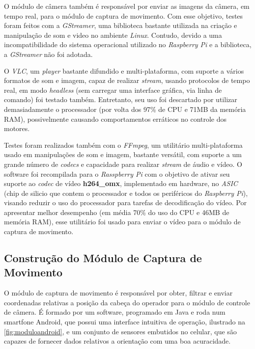 O módulo de câmera também é responsável por enviar as imagens da câmera, em tempo real, para o módulo de captura de movimento. Com esse objetivo, testes foram feitos com a \textit{GStreamer}, uma biblioteca bastante utilizada na criação e manipulação de som e video no ambiente \textit{Linux}. Contudo, devido a uma incompatibilidade do sistema operacional utilizado no \textit{Raspberry Pi} e a biblioteca, a \textit{GStreamer} não foi adotada.\par

O \textit{VLC}, um \textit{player} bastante difundido e multi-plataforma, com suporte a vários formatos de som e imagem, capaz de realizar \textit{stream}, usando protocolos de tempo real, em modo \textit{headless} (sem carregar uma interface gráfica, via linha de comando) foi testado também. Entretanto, seu uso foi descartado por utilizar demasiadamente o processador (por volta dos 97\% de CPU e 71MB da memória RAM), possivelmente causando comportamentos erráticos no controle dos motores.\par

Testes foram realizados também com o \textit{FFmpeg}, um utilitário multi-plataforma usado em manipulações de som e imagem, bastante versátil, com suporte a um grande número de \textit{codecs} e capacidade para realizar \textit{stream} de áudio e vídeo. O software foi recompilada para o \textit{Rasspberry Pi} com o objetivo de ativar seu suporte ao \textit{codec} de vídeo \textbf{h264\_omx}, implementado em hardware, no \textit{ASIC} (chip de silicio que contem o processador e todos os periféricos do \textit{Raspberry Pi}), visando reduzir o uso do processador para tarefas de decodificação do vídeo. Por apresentar melhor desempenho (em média 70\% do uso do CPU e 46MB de memória RAM), esse utilitário foi usado para enviar o vídeo para o módulo de captura de movimento.



\subsection{Construção do Módulo de Captura de Movimento}
\label{subsec:assemmodcapmov}

O módulo de captura de movimento é responsável por obter, filtrar e enviar coordenadas relativas a posição da cabeça do operador para o módulo de controle de câmera. É formado por um software, programado em Java e roda num smartfone Android, que possui uma interface intuitiva de operação, ilustrado na \autoref{fig:moduloandroid}, e um conjunto de sensores embutidos no celular, que são capazes de fornecer dados relativos a orientação com uma boa acuracidade. \par

